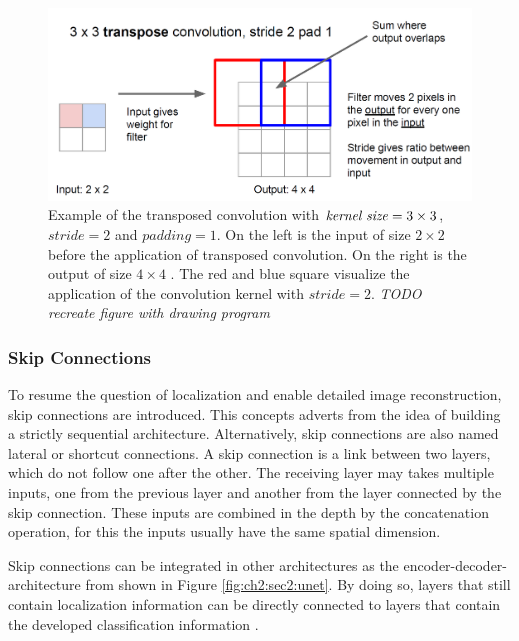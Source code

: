 \begin{figure}
	\includegraphics[width=\linewidth]{figures/chap223_transpose_conv.png}
	\caption[Transposed Convolution]{
		Example of the transposed convolution with $\textnormal{\textit{kernel size}} = 3 \times 3$, $stride = 2$ and $padding = 1$. 
		On the left is the input of size $2 \times 2$  before the application of transposed convolution.
		On the right is the output of size $4 \times 4$ . 
		The red and blue square visualize the application of the convolution kernel with $stride = 2$. 
		\textit{TODO recreate figure with drawing program}}
	\label{fig:ch2:sec2:transposed-conv}
\end{figure}


\subsubsection{Skip Connections} \label{ord:ch2:sec2:subsec_arch:skipconnections}

To resume the question of localization and enable detailed image reconstruction, skip connections are introduced. 
This concepts adverts from the idea of building a strictly sequential architecture.
Alternatively, skip connections are also named lateral or shortcut connections.
A skip connection is a link between two layers, which do not follow one after the other. 
The receiving layer may takes multiple inputs, one from the previous layer and another from the layer connected by the skip connection.
These inputs are combined in the depth by the concatenation operation, for this the inputs usually have the same spatial dimension.

Skip connections can be integrated in other architectures as \eg the encoder-decoder-architecture from \cite{RF15-U-Net} shown in Figure \ref{fig:ch2:sec2:unet}.
By doing so, layers that still contain localization information can be directly connected to layers that contain the developed classification information \cite{LSD15-FCN}.

